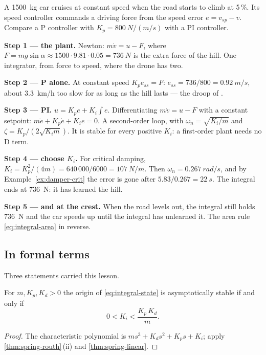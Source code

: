 \begin{example}
\label{ex:integral-cruise}
A \SI{1500}{kg} car cruises at constant speed when the road starts to climb at 5\,\%. Its speed controller commands a driving force from the speed error $e = v_{sp} - v$. Compare a P controller with $K_p = \SI{800}{N/(m/s)}$ with a PI controller.

\textbf{Step 1 — the plant.} Newton: $m\dot v = u - F$, where $F = mg\sin\alpha \approx 1500 \cdot 9.81 \cdot 0.05 = \SI{736}{N}$ is the extra force of the hill. One integrator, from force to speed, where the drone has two.

\textbf{Step 2 — P alone.} At constant speed $K_p e_{ss} = F$: $e_{ss} = 736/800 = \SI{0.92}{m/s}$, about \SI{3.3}{km/h} too slow for as long as the hill lasts — the droop of .

\textbf{Step 3 — PI.} $u = K_p e + K_i\int e$. Differentiating $m\dot v = u - F$ with a constant setpoint: $m\ddot e + K_p\dot e + K_i e = 0$. A second-order loop, with $\omega_n = \sqrt{K_i/m}$ and $\zeta = K_p/(2\sqrt{K_i m})$. It is stable for every positive $K_i$: a first-order plant needs no D term.

\textbf{Step 4 — choose $K_i$.} For critical damping, $K_i = K_p^2/(4m) = 640\,000/6000 = \SI{107}{N/m}$. Then $\omega_n = \SI{0.267}{rad/s}$, and by Example~\ref{ex:damper-crit} the error is gone after $5.83/0.267 = \SI{22}{s}$. The integral ends at \SI{736}{N}: it has learned the hill.

\textbf{Step 5 — and at the crest.} When the road levels out, the integral still holds \SI{736}{N} and the car speeds up until the integral has unlearned it. The area rule \eqref{eq:integral-area} in reverse.
\end{example}

\subsection{In formal terms}
Three statements carried this lesson.

\begin{theorem}
\label{thm:integral-stability}
For $m, K_p, K_d > 0$ the origin of \cref{eq:integral-state} is asymptotically stable if and only if
\begin{equation*}
  0 < K_i < \frac{K_p\,K_d}{m} .
\end{equation*}
\end{theorem}
\begin{proof}
The characteristic polynomial is $m s^3 + K_d s^2 + K_p s + K_i$; apply \cref{thm:spring-routh}\,(ii) and \cref{thm:spring-linear}.
\end{proof}

